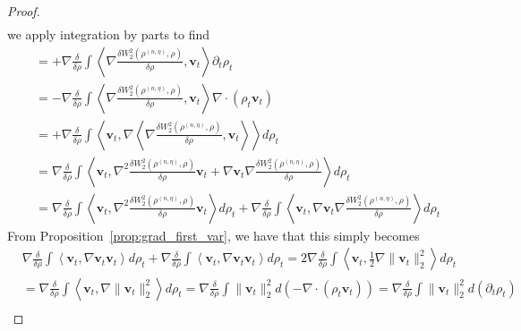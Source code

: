 \documentclass[10pt,a4paper]{amsart}
\begin{document}
\begin{proof}
\begin{align*}
\end{align*}
we apply integration by parts to find
\begin{align*}
    &= +\nabla\frac{\delta}{\delta\rho} \int \left\langle \nabla\frac{\delta W_{2}^{2}(\rho^{(n,\eta)}, \rho) }{\delta \rho}, \mathbf{v}_{t} \right\rangle \partial_{t} \rho_{t} \\
    &= -\nabla\frac{\delta}{\delta\rho} \int \left\langle \nabla\frac{\delta W_{2}^{2}(\rho^{(n,\eta)}, \rho) }{\delta \rho}, \mathbf{v}_{t} \right\rangle \nabla \cdot (\rho_{t} \mathbf{v}_{t} )
    \\
    &= + \nabla\frac{\delta}{\delta\rho} \int \left\langle \mathbf{v}_{t}, \nabla\left\langle \nabla\frac{\delta W_{2}^{2}(\rho^{(n,\eta)}, \rho) }{\delta \rho}, \mathbf{v}_{t} \right\rangle \right\rangle d\rho_{t} \\
    &= \nabla\frac{\delta}{\delta\rho} \int \left\langle \mathbf{v}_{t}, \nabla^{2}\frac{\delta W_{2}^{2}(\rho^{(n,\eta)}, \rho) }{\delta \rho} \mathbf{v}_{t} + \nabla \mathbf{v}_{t} \nabla \frac{\delta W_{2}^{2}(\rho^{(n,\eta)}, \rho) }{\delta \rho} \right\rangle  d\rho_{t} \\
    &= \nabla\frac{\delta}{\delta\rho} \int \left\langle \mathbf{v}_{t}, \nabla^{2}\frac{\delta W_{2}^{2}(\rho^{(n,\eta)}, \rho) }{\delta \rho} \mathbf{v}_{t}  \right\rangle  d\rho_{t} + \nabla\frac{\delta}{\delta\rho} \int \left\langle \mathbf{v}_{t},  \nabla \mathbf{v}_{t} \nabla \frac{\delta W_{2}^{2}(\rho^{(n,\eta)}, \rho) }{\delta \rho} \right\rangle  d\rho_{t} 
    \end{align*}
    From Proposition~\ref{prop:grad_first_var}, we have that this simply becomes
    \begin{align*}
        &\nabla\frac{\delta}{\delta\rho} \int \left\langle \mathbf{v}_{t}, \nabla\mathbf{v}_{t} \mathbf{v}_{t}  \right\rangle  d\rho_{t} + \nabla\frac{\delta}{\delta\rho} \int \left\langle \mathbf{v}_{t},  \nabla \mathbf{v}_{t} \mathbf{v}_{t} \right\rangle  d\rho_{t} = 2 \nabla\frac{\delta}{\delta\rho} \int \left\langle \mathbf{v}_{t}, \frac{1}{2}\nabla \lVert \mathbf{v}_{t} \rVert_{2}^{2} \right\rangle  d\rho_{t} \\
        &=  \nabla\frac{\delta}{\delta\rho} \int \left\langle \mathbf{v}_{t}, \nabla \lVert \mathbf{v}_{t} \rVert_{2}^{2} \right\rangle  d\rho_{t}  =\nabla\frac{\delta}{\delta\rho} \int \lVert \mathbf{v}_{t} \rVert_{2}^{2}  d \left(- \nabla \cdot (\rho_{t} \mathbf{v}_{t} ) \right) = \nabla\frac{\delta}{\delta\rho} \int \lVert \mathbf{v}_{t} \rVert_{2}^{2}  d (\partial_{t} \rho_{t}) \\

\end{align*}
\end{proof}
\end{document}
